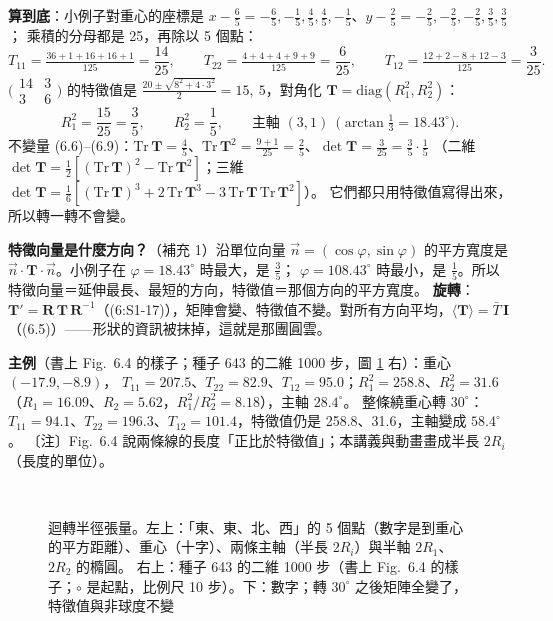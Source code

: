 \textbf{算到底}：小例子對重心的座標是 $x-\frac65=-\frac65,-\frac15,\frac45,\frac45,-\frac15$、$y-\frac25=-\frac25,-\frac25,-\frac25,\frac35,\frac35$；
乘積的分母都是 25，再除以 5 個點：
\[T_{11}=\tfrac{36+1+16+16+1}{125}=\frac{14}{25},\qquad T_{22}=\tfrac{4+4+4+9+9}{125}=\frac{6}{25},\qquad
T_{12}=\tfrac{12+2-8+12-3}{125}=\frac{3}{25}.\]
$\big(\begin{smallmatrix}14&3\\3&6\end{smallmatrix}\big)$ 的特徵值是 $\frac{20\pm\sqrt{8^2+4\cdot3^2}}{2}=15,\ 5$，對角化 $\mathbf T=\mathrm{diag}(R_1^2,R_2^2)$：
\[R_1^2=\frac{15}{25}=\frac35,\qquad R_2^2=\frac15,\qquad\text{主軸 }(3,1)\ \ \big(\arctan\tfrac13=18.43^\circ\big).\tag{6.4}\]
不變量 (6.6)--(6.9)：$\mathrm{Tr}\,\mathbf T=\frac45$、$\mathrm{Tr}\,\mathbf T^2=\frac{9+1}{25}=\frac25$、$\det\mathbf T=\frac3{25}=\frac35\cdot\frac15$
（二維 $\det\mathbf T=\frac12[(\mathrm{Tr}\,\mathbf T)^2-\mathrm{Tr}\,\mathbf T^2]$；三維 $\det\mathbf T=\frac16[(\mathrm{Tr}\,\mathbf T)^3+2\,\mathrm{Tr}\,\mathbf T^3-3\,\mathrm{Tr}\,\mathbf T\,\mathrm{Tr}\,\mathbf T^2]$）。
它們都只用特徵值寫得出來，所以轉一轉不會變。

\textbf{特徵向量是什麼方向？}（補充 1）沿單位向量 $\vec n=(\cos\varphi,\sin\varphi)$ 的平方寬度是 $\vec n\cdot\mathbf T\cdot\vec n$。小例子在 $\varphi=18.43^\circ$ 時最大，是 $\frac35$；
$\varphi=108.43^\circ$ 時最小，是 $\frac15$。所以特徵向量＝延伸最長、最短的方向，特徵值＝那個方向的平方寬度。
\textbf{旋轉}：$\mathbf T'=\mathbf R\,\mathbf T\,\mathbf R^{-1}$（(6:S1-17)），矩陣會變、特徵值不變。對所有方向平均，$\langle\mathbf T\rangle=\bar T\,\mathbf I$（(6.5)）——形狀的資訊被抹掉，這就是那團圓雲。

\textbf{主例}（書上 Fig.~6.4 的樣子；種子 643 的二維 1000 步，圖 \ref{six-fig-shape} 右）：重心 $(-17.9,-8.9)$，
$T_{11}=207.5$、$T_{22}=82.9$、$T_{12}=95.0$；$R_1^2=258.8$、$R_2^2=31.6$（$R_1=16.09$、$R_2=5.62$，$R_1^2/R_2^2=8.18$），主軸 $28.4^\circ$。
整條繞重心轉 $30^\circ$：$T_{11}=94.1$、$T_{22}=196.3$、$T_{12}=101.4$，特徵值仍是 258.8、31.6，主軸變成 $58.4^\circ$。
〔注〕Fig.~6.4 說兩條線的長度「正比於特徵值」；本講義與動畫畫成半長 $2R_i$（長度的單位）。

\begin{figure}[htbp]
\centering
\SixFigSmall\hfill\SixFigMain\\[6pt]
{\small\SixTabMain}
\caption{迴轉半徑張量。左上：「東、東、北、西」的 5 個點（數字是到重心的平方距離）、重心（十字）、兩條主軸（半長 $2R_i$）與半軸 $2R_1$、$2R_2$ 的橢圓。
右上：種子 643 的二維 1000 步（書上 Fig.~6.4 的樣子；$\circ$ 是起點，比例尺 10 步）。下：數字；轉 $30^\circ$ 之後矩陣全變了，特徵值與非球度不變}\label{six-fig-shape}
\end{figure}

